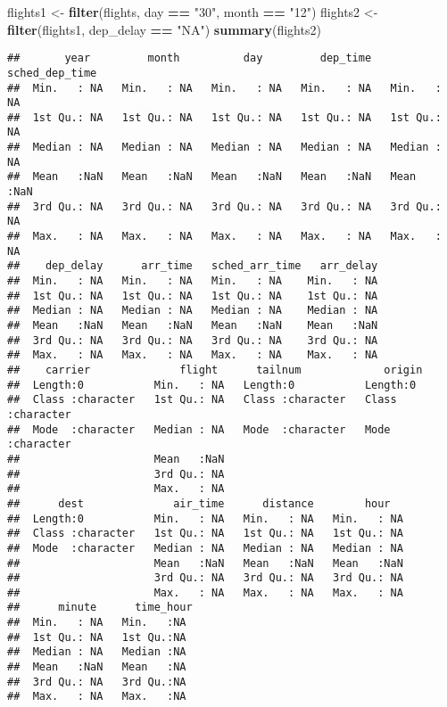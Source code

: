 \documentclass[]{article}
\newenvironment{Shaded}{\begin{snugshade}}{\end{snugshade}}
\newcommand{\KeywordTok}[1]{\textcolor[rgb]{0.13,0.29,0.53}{\textbf{#1}}}
\newcommand{\StringTok}[1]{\textcolor[rgb]{0.31,0.60,0.02}{#1}}
\newcommand{\OperatorTok}[1]{\textcolor[rgb]{0.81,0.36,0.00}{\textbf{#1}}}
\newcommand{\NormalTok}[1]{#1}
\begin{document}
\begin{Shaded}
\begin{Highlighting}[]
\NormalTok{flights1 <-}\StringTok{ }\KeywordTok{filter}\NormalTok{(flights, day }\OperatorTok{==}\StringTok{ "30"}\NormalTok{, month }\OperatorTok{==}\StringTok{ "12"}\NormalTok{)}
\NormalTok{flights2 <-}\StringTok{ }\KeywordTok{filter}\NormalTok{(flights1, dep_delay }\OperatorTok{==}\StringTok{ "NA"}\NormalTok{)}
\KeywordTok{summary}\NormalTok{(flights2)}
\end{Highlighting}
\end{Shaded}

\begin{verbatim}
##       year         month          day         dep_time   sched_dep_time
##  Min.   : NA   Min.   : NA   Min.   : NA   Min.   : NA   Min.   : NA   
##  1st Qu.: NA   1st Qu.: NA   1st Qu.: NA   1st Qu.: NA   1st Qu.: NA   
##  Median : NA   Median : NA   Median : NA   Median : NA   Median : NA   
##  Mean   :NaN   Mean   :NaN   Mean   :NaN   Mean   :NaN   Mean   :NaN   
##  3rd Qu.: NA   3rd Qu.: NA   3rd Qu.: NA   3rd Qu.: NA   3rd Qu.: NA   
##  Max.   : NA   Max.   : NA   Max.   : NA   Max.   : NA   Max.   : NA   
##    dep_delay      arr_time   sched_arr_time   arr_delay  
##  Min.   : NA   Min.   : NA   Min.   : NA    Min.   : NA  
##  1st Qu.: NA   1st Qu.: NA   1st Qu.: NA    1st Qu.: NA  
##  Median : NA   Median : NA   Median : NA    Median : NA  
##  Mean   :NaN   Mean   :NaN   Mean   :NaN    Mean   :NaN  
##  3rd Qu.: NA   3rd Qu.: NA   3rd Qu.: NA    3rd Qu.: NA  
##  Max.   : NA   Max.   : NA   Max.   : NA    Max.   : NA  
##    carrier              flight      tailnum             origin         
##  Length:0           Min.   : NA   Length:0           Length:0          
##  Class :character   1st Qu.: NA   Class :character   Class :character  
##  Mode  :character   Median : NA   Mode  :character   Mode  :character  
##                     Mean   :NaN                                        
##                     3rd Qu.: NA                                        
##                     Max.   : NA                                        
##      dest              air_time      distance        hour    
##  Length:0           Min.   : NA   Min.   : NA   Min.   : NA  
##  Class :character   1st Qu.: NA   1st Qu.: NA   1st Qu.: NA  
##  Mode  :character   Median : NA   Median : NA   Median : NA  
##                     Mean   :NaN   Mean   :NaN   Mean   :NaN  
##                     3rd Qu.: NA   3rd Qu.: NA   3rd Qu.: NA  
##                     Max.   : NA   Max.   : NA   Max.   : NA  
##      minute      time_hour 
##  Min.   : NA   Min.   :NA  
##  1st Qu.: NA   1st Qu.:NA  
##  Median : NA   Median :NA  
##  Mean   :NaN   Mean   :NA  
##  3rd Qu.: NA   3rd Qu.:NA  
##  Max.   : NA   Max.   :NA
\end{verbatim}
\end{document}
